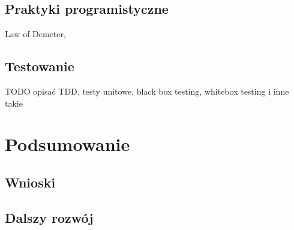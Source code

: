 \documentclass[a4paper,onecolumn,oneside,11pt,wide,floatssmall]{mwrep}
\theoremstyle{definition}
\theoremstyle{plain}%
\theoremstyle{remark}
\begin{document}
\section{Praktyki programistyczne}
Law of Demeter,

\section{Testowanie}
TODO opisać TDD, testy unitowe, black box testing, whitebox testing i inne takie

\chapter{Podsumowanie}
\section{Wnioski}

\section{Dalszy rozwój}



\appendix


\nocite{*}


% 

\end{document}
